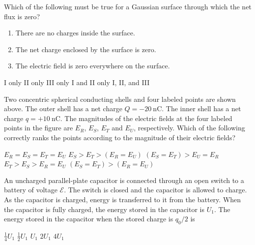 \documentclass{../../../oss-apphys-exam}
\begin{document}
\begin{questions}
  \question Which of the following must be true for a Gaussian surface through
  which the net flux is zero?
  \begin{enumerate}[label={\Roman*.},nosep]
  \item There are no charges inside the surface.
  \item The net charge enclosed by the surface is zero.
  \item The electric field is zero everywhere on the surface.
  \end{enumerate}
  \begin{choices}
    \choice I only
    \choice II only
    \choice III only
    \choice I and II only
    \choice I, II, and III
  \end{choices}
  \question Two concentric spherical conducting shells and four labeled points
  are shown above. The outer shell has a net charge $Q=-\SI{20}{\nano\coulomb}$.
  The inner shell has a net charge $q=+\SI{10}{\nano\coulomb}$. The magnitudes
  of the electric fields at the four labeled points in the figure are $E_R$,
  $E_S$, $E_T$ and $E_U$, respectively. Which of the following correctly ranks
  the points according to the magnitude of their electric fields?
  \begin{choices}
    \choice $E_R=E_S=E_T=E_U$ 
    \choice $E_S>E_T>(E_R=E_U)$
    \choice $(E_S=E_T)>E_U=E_R$
    \choice $E_T>E_S>E_R=E_U$
    \choice $(E_S=E_T)>(E_R=E_U)$ 
  \end{choices}
  \newpage

  \question An uncharged parallel-plate capacitor is connected through an open
  switch to a battery of voltage $\mathcal E$. The switch is closed and the
  capacitor is allowed to charge. As the capacitor is charged, energy is
  transferred to it from the battery. When the capacitor is fully charged, the
  energy stored in the capacitor is $U_1$. The energy stored in the capacitor
  when the stored charge is $q_0/2$ is
  \begin{choices}
    \choice $\frac14 U_1$
    \choice $\frac12 U_1$
    \choice $U_1$
    \choice $2U_1$
    \choice $4U_1$
  \end{choices}


\end{questions}
\end{document}
